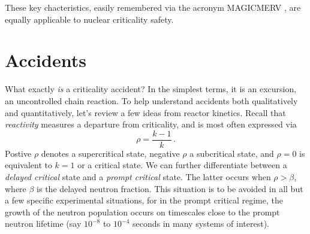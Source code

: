 These key chacteristics, easily remembered via the acronym 
MAGICMERV \cite{handbook}, are equally applicable to nuclear
criticality safety.  



\section*{Accidents}

What exactly \textit{is} a criticality accident?  In the simplest terms,
it is an excursion, an uncontrolled chain reaction.  To help understand
accidents
both qualitatively and quantitatively, let's review a few ideas from
reactor kinetics.  Recall that \textit{reactivity} measures a departure
from criticality, and is most often expressed via
\begin{equation}
 \rho = \frac{k-1}{k} \, .
\end{equation}
Postive $\rho$ denotes a supercritical state, negative $\rho$ a 
subcritical state, and $\rho = 0$ is equivalent to $k=1$ or a 
critical state.  We can further differentiate between a \textit{delayed
critical} state and a \textit{prompt critical} state.  The latter 
occurs when $\rho > \beta$, where $\beta$ is the delayed neutron
fraction.  This situation is to be avoided in all but a few specific
experimental situations, for in the prompt critical regime, 
the growth of the neutron population occurs on timescales close
to the prompt neutron lifetime (say $10^{-8}$ to $10^{-4}$ seconds in many
systems of interest).  

